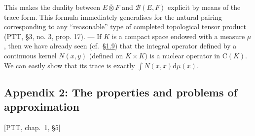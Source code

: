 \documentclass[british]{article}
\begin{document}
This makes the duality between \(E\bar{\otimes}F\) and
\(\mathscr{B}(E,F)\) explicit by means of the trace form. This formula
immediately generalises for the natural pairing corresponding to any
``reasonable'' type of completed topological tensor product (PTT, §3,
no. 3, prop. 17). --- If \(K\) is a compact space endowed with a measure
\(\mu\), then we have already seen (cf.~\hyperref[section-1.9]{§1.9})
that the integral operator defined by a continuous kernel \(N(x,y)\)
(defined on \(K\times K\)) is a nuclear operator in \(\mathrm{C}(K)\).
We can easily show that its trace is exactly
\(\int N(x,x)\mathrm{d}\mu(x)\).

\subsection*{Appendix 2: The properties and problems of
approximation}\label{section-1-appendix-2}

{[}PTT, chap.~1, §5{]}
\end{document}

